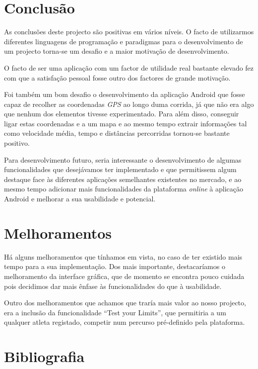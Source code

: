 \documentclass[15pt,a4paper]{article}
\begin{document}
\newpage
\section{Conclusão}

As conclusões deste projecto são positivas em vários níveis. O facto de utilizarmos diferentes linguagens de programação e paradigmas para o desenvolvimento de um projecto torna-se um desafio e a maior motivação de desenvolvimento. 

O facto de ser uma aplicação com um factor de utilidade real bastante elevado fez com que a satisfação pessoal fosse outro dos factores de grande motivação.

Foi também um bom desafio o desenvolvimento da aplicação Android que fosse capaz de recolher as coordenadas \textit{GPS} ao longo duma corrida, já que não era algo que nenhum dos elementos tivesse experimentado. Para além disso, conseguir ligar estas coordenadas e a um mapa e ao mesmo tempo extrair informações tal como velocidade média, tempo e distâncias percorridas tornou-se bastante positivo.

Para desenvolvimento futuro, seria interessante o desenvolvimento de algumas funcionalidades que desejávamos ter implementado e que permitissem algum destaque face às diferentes aplicações semelhantes existentes no mercado, e ao mesmo tempo adicionar mais funcionalidades da plataforma \textit{online} à aplicação Android e melhorar a sua usabilidade e potencial.


\section{Melhoramentos}

Há alguns melhoramentos que tínhamos em vista, no caso de ter existido mais tempo para a sua implementação. Dos mais importante, destacaríamos o melhoramento da interface gráfica, que de momento se encontra pouco cuidada pois decidimos dar mais ênfase às funcionalidades do que à usabilidade.

Outro dos melhoramentos que achamos que traría mais valor ao nosso projecto, era a inclusão da funcionalidade “Test your Limits”, que permitiria a um qualquer atleta registado, competir num percurso pré-definido pela plataforma.

\section{Bibliografia}
\end{document}
